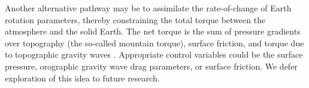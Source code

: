 Another alternative pathway may be to assimilate the rate-of-change of Earth rotation parameters, thereby constraining the total torque between the atmosphere and the solid Earth. 
The net torque is the sum of pressure gradients over topography (the so-called mountain torque), surface friction, and torque due to topographic gravity waves \citep{Lejenas1997}. 
Appropriate control variables could be the surface pressure, orographic gravity wave drag parameters, or surface friction. 
We defer exploration of this idea to future research. 


